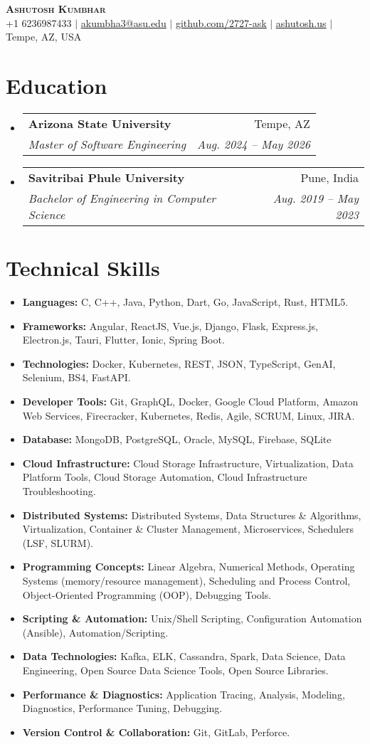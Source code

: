\documentclass[letterpaper,11pt]{article}
\makeatletter
\newcommand{\resumeItem}[1]{
  \item\small{
    {#1 \vspace{-2pt}}
  }
}
\newcommand{\resumeSubheading}[4]{
  \vspace{-2pt}\item
    \begin{tabular*}{0.97\textwidth}[t]{l@{\extracolsep{\fill}}r}
      \textbf{#1} & #2 \\
      \textit{\small#3} & \textit{\small #4} \\
    \end{tabular*}\vspace{-7pt}
}
\newcommand{\resumeSubItem}[1]{\resumeItem{#1}\vspace{-4pt}}
\newcommand{\resumeSubHeadingListStart}{\begin{itemize}[leftmargin=0.15in, label={}]}
\newcommand{\resumeSubHeadingListEnd}{\end{itemize}}
\makeatother
\begin{document}
\begin{center}
    \textbf{\Huge \scshape Ashutosh Kumbhar} \\ \vspace{1pt}
    \small +1 6236987433 $|$ \href{mailto:akumbha3@asu.edu}{\underline{akumbha3@asu.edu}} $|$ 
    \href{https://github.com/2727-ask}{\underline{github.com/2727-ask}} $|$
    \href{https://ashutosh.us}{\underline{ashutosh.us}} $|$
    \small Tempe, AZ, USA
\end{center}


\section{Education}
  \resumeSubHeadingListStart
    \resumeSubheading
      {Arizona State University}{Tempe, AZ}
      {Master of Software Engineering}{Aug. 2024 -- May 2026}
    \resumeSubheading
      {Savitribai Phule University}{Pune, India}
      {Bachelor of Engineering in Computer Science}{Aug. 2019 -- May 2023}
  \resumeSubHeadingListEnd
  

\section{Technical Skills}
\resumeSubHeadingListStart
  \resumeSubItem{\textbf{Languages:} C, C++, Java, Python, Dart, Go, JavaScript, Rust, HTML5.}
  \resumeSubItem{\textbf{Frameworks:} Angular, ReactJS, Vue.js, Django, Flask, Express.js, Electron.js, Tauri, Flutter, Ionic, Spring Boot.}
  \resumeSubItem{\textbf{Technologies:} Docker, Kubernetes, REST, JSON, TypeScript, GenAI, Selenium, BS4, FastAPI.}
  \resumeSubItem{\textbf{Developer Tools:} Git, GraphQL, Docker, Google Cloud Platform, Amazon Web Services, Firecracker, Kubernetes, Redis, Agile, SCRUM, Linux, JIRA.}
  \resumeSubItem{\textbf{Database:} MongoDB, PostgreSQL, Oracle, MySQL, Firebase, SQLite}
  \resumeSubItem{\textbf{Cloud Infrastructure:} Cloud Storage Infrastructure, Virtualization, Data Platform Tools, Cloud Storage Automation, Cloud Infrastructure Troubleshooting.}
  \resumeSubItem{\textbf{Distributed Systems:} Distributed Systems, Data Structures & Algorithms, Virtualization, Container & Cluster Management, Microservices, Schedulers (LSF, SLURM).}
  \resumeSubItem{\textbf{Programming Concepts:} Linear Algebra, Numerical Methods, Operating Systems (memory/resource management), Scheduling and Process Control, Object-Oriented Programming (OOP), Debugging Tools.}
  \resumeSubItem{\textbf{Scripting & Automation:} Unix/Shell Scripting, Configuration Automation (Ansible), Automation/Scripting.}
  \resumeSubItem{\textbf{Data Technologies:} Kafka, ELK, Cassandra, Spark, Data Science, Data Engineering, Open Source Data Science Tools, Open Source Libraries.}
  \resumeSubItem{\textbf{Performance & Diagnostics:} Application Tracing, Analysis, Modeling, Diagnostics, Performance Tuning, Debugging.}
  \resumeSubItem{\textbf{Version Control & Collaboration:} Git, GitLab, Perforce.}
\resumeSubHeadingListEnd
\end{document}
